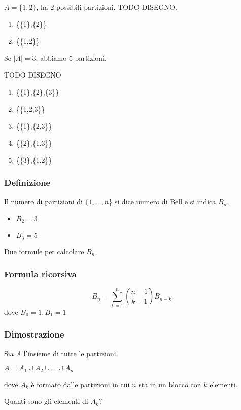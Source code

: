 \documentclass[11pt]{article}
\begin{document}
		$A = \{1,2\}$, ha $2$ possibili partizioni. TODO DISEGNO.

		\begin{enumerate}
			\item \{\{1\},\{2\}\}
			\item \{\{1,2\}\}
		\end{enumerate}

		Se $|A| = 3$, abbiamo $5$ partizioni.
		
		TODO DISEGNO
		\begin{enumerate}
			\item \{\{1\},\{2\},\{3\}\}
			\item \{\{1,2,3\}\}
			\item \{\{1\},\{2,3\}\}
			\item \{\{2\},\{1,3\}\}
			\item \{\{3\},\{1,2\}\}
		\end{enumerate}

		\subsubsection{Definizione}

		Il numero di partizioni di $\{1,\ldots,n\}$ si dice numero di Bell
		e si indica $B_n$.

		\begin{itemize}
			\item $B_2 = 3$
			\item $B_3 = 5$
		\end{itemize}

		Due formule per calcolare $B_n$.

		\subsubsection{Formula ricorsiva}
		
	\[
		B_n = \sum_{k=1}^{n}\binom{n-1}{k-1} B_{n-k}
	\]
		dove $B_0 = 1, B_1 = 1$.

		\subsubsection{Dimostrazione}

		Sia $A$ l'insieme di tutte le partizioni.

		$A = A_1 \cup A_2 \cup \ldots \cup A_n$
		
		dove $A_k$ \`e formato dalle partizioni in cui $n$ sta in un blocco con
		$k$ elementi.

		Quanti sono gli elementi di $A_k$?
\end{document}
